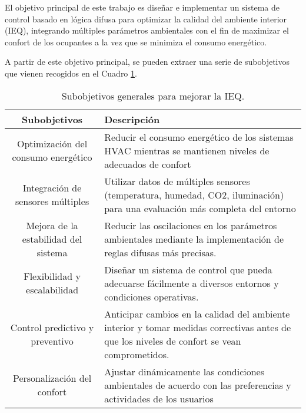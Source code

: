 El objetivo principal de este trabajo es diseñar e implementar un sistema de control basado en lógica difusa para optimizar la calidad del ambiente interior (IEQ), integrando múltiples parámetros ambientales con el fin de maximizar el confort de los ocupantes a la vez que se minimiza el consumo energético.

A partir de este objetivo principal, se pueden extraer una serie de subobjetivos que vienen recogidos en el Cuadro \ref{tab:subobjetivos}.

\begin{table}[H]
	\centering
	\begin{tabular}{| c | p{9.6cm} |}
		\hline
		\rowcolor{lightgray}
		\textbf{Subobjetivos} & \textbf{Descripción} \\
		\hline
		Optimización del consumo energético & 
		Reducir el consumo energético de los sistemas HVAC mientras se mantienen niveles de adecuados de confort \vspace{0.2cm} \\
		\hline
		Integración de sensores múltiples & 
		Utilizar datos de múltiples sensores (temperatura, humedad, CO2, iluminación) para una evaluación más completa del entorno 
		\vspace{0.2cm} \\
		\hline
		Mejora de la estabilidad del sistema & 
		Reducir las oscilaciones en los parámetros ambientales mediante la implementación de reglas difusas más precisas.
		\vspace{0.2cm} \\
		\hline
		Flexibilidad y escalabilidad & 
		Diseñar un sistema de control que pueda adecuarse fácilmente a diversos entornos y condiciones operativas.
		\vspace{0.2cm} \\
		\hline
		Control predictivo y preventivo & 
		Anticipar cambios en la calidad del ambiente interior y tomar medidas correctivas antes de que los niveles de confort se vean comprometidos.
		\vspace{0.2cm} \\
		\hline
		Personalización del confort &
		Ajustar dinámicamente las condiciones ambientales de acuerdo con las preferencias y actividades de los usuarios
		\vspace{0.2cm} \\
		\hline
	\end{tabular}
	\caption{Subobjetivos generales para mejorar la IEQ.}
	\label{tab:subobjetivos}
\end{table}